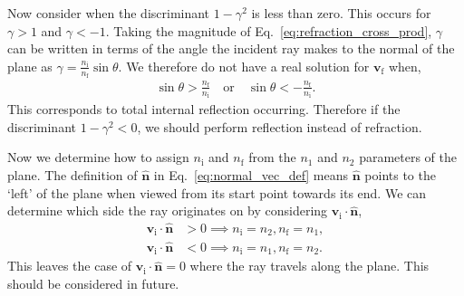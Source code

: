 \documentclass{article}
\let\vec \bm
\newcommand{\mrm}[1]{\mathrm{#1}}
\begin{document}
Now consider when the discriminant $1 - \gamma^2$ is less than zero. This occurs for $\gamma > 1$ and $\gamma < -1$. Taking the magnitude of Eq.~\ref{eq:refraction_cross_prod}, $\gamma$ can be written in terms of the angle the incident ray makes to the normal of the plane as $\gamma = \frac{n_\mrm{i}}{n_\mrm{f}} \sin \theta$. We therefore do not have a real solution for $\vec{v}_\mrm{f}$ when,
\begin{align}
    \sin \theta > \frac{n_\mrm{f}}{n_\mrm{i}} \quad \mathrm{or} \quad \sin \theta < -\frac{n_\mrm{f}}{n_\mrm{i}}.
\end{align}
This corresponds to total internal reflection occurring. Therefore if the discriminant $1 - \gamma^2 < 0$, we should perform reflection instead of refraction.

Now we determine how to assign $n_\mrm{i}$ and $n_\mrm{f}$ from the $n_1$ and $n_2$ parameters of the plane. The definition of $\vec{\hat{n}}$ in Eq.~\ref{eq:normal_vec_def} means $\vec{\hat{n}}$ points to the `left' of the plane when viewed from its start point towards its end. We can determine which side the ray originates on by considering $\vec{v_\mrm{i}} \cdot \vec{\hat{n}}$,
\begin{align}
    \vec{v_\mrm{i}} \cdot \vec{\hat{n}} 
    &>
    0
    \implies
    n_\mrm{i} = n_2, n_\mrm{f} = n_1, \\
    \vec{v_\mrm{i}} \cdot \vec{\hat{n}} 
    &<
    0
    \implies
    n_\mrm{i} = n_1, n_\mrm{f} = n_2.
\end{align}
This leaves the case of $\vec{v_\mrm{i}} \cdot \vec{\hat{n}} = 0$ where the ray travels along the plane. This should be considered in future.
\end{document}
